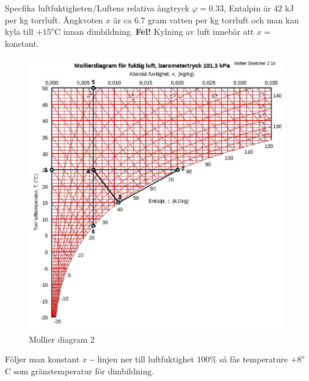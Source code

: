 \documentclass[./exercises.tex]{subfiles}
\begin{document}
\begin{enumerate}
Specfika luftfuktigheten/Luftens relativa ångtryck $\varphi = 0.33$, Entalpin
är $42$ kJ per kg torrluft. Ångkvoten $x$ är ca 6.7 gram vatten per kg torrluft
och man kan kyla till $+15^o$C innan dimbildning. \textbf{Fel!} Kylning av luft innebär att
$x=$ konstant.

\begin{figure}[H]
  \includegraphics[width=\linewidth]{process3.eps}
  \caption{Mollier diagram 2}
  \label{fig4}
\end{figure}

Följer man konstant $x-$linjen ner till luftfuktighet $100\%$ så fås temperature
$+8^o$C som gränstemperatur för dimbildning.

\end{enumerate}






\end{document}
